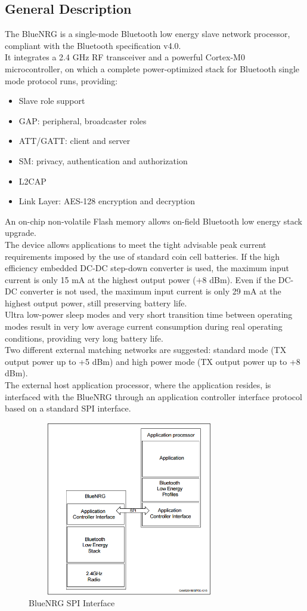 \subsection{General Description}
The BlueNRG is a single-mode Bluetooth low energy slave network processor, compliant with the Bluetooth specification v4.0.\\
It integrates a 2.4 GHz RF transceiver and a powerful Cortex-M0 microcontroller, on which a complete power-optimized stack for Bluetooth single mode protocol runs, providing:
\begin{itemize}
	\item Slave role support
	\item GAP: peripheral, broadcaster roles
	\item ATT/GATT: client and server
	\item SM: privacy, authentication and authorization
	\item L2CAP
	\item Link Layer: AES-128 encryption and decryption
\end{itemize}
An on-chip non-volatile Flash memory allows on-field Bluetooth low energy stack upgrade.\\
The device allows applications to meet the tight advisable peak current requirements imposed by the use of standard coin cell batteries. If the high efficiency embedded DC-DC step-down converter is used, the maximum input current is only 15 mA at the highest output power (+8 dBm). Even if the DC-DC converter is not used, the maximum input current is only 29 mA at the highest output power, still preserving battery life.\\
Ultra low-power sleep modes and very short transition time between operating modes result in very low average current consumption during real operating conditions, providing very long battery life.\\
Two different external matching networks are suggested: standard mode (TX output power up to +5 dBm) and high power mode (TX output power up to +8 dBm).\\
The external host application processor, where the application resides, is interfaced with the BlueNRG through an application controller interface protocol based on a standard SPI interface.
\begin{figure}[ht]
	\centering
	\includegraphics[width=3.5in, height=3in]{images/bluenrg_spi.png}
	\caption{BlueNRG SPI Interface}
\end{figure}
